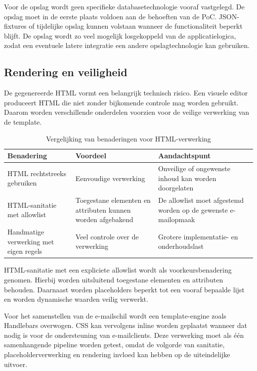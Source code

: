 Voor de opslag wordt geen specifieke databasetechnologie vooraf vastgelegd.
De opslag moet in de eerste plaats voldoen aan de behoeften van de PoC.
JSON-fixtures of tijdelijke opslag kunnen volstaan wanneer de functionaliteit
beperkt blijft. De opslag wordt zo veel mogelijk losgekoppeld van de
applicatielogica, zodat een eventuele latere integratie een andere
opslagtechnologie kan gebruiken.

\subsection{Rendering en veiligheid}
De gegenereerde HTML vormt een belangrijk technisch risico. Een visuele
editor produceert HTML die niet zonder bijkomende controle mag worden
gebruikt. Daarom worden verschillende onderdelen voorzien voor de veilige
verwerking van de template.

\begin{table}[htbp]
    \centering
    \caption{Vergelijking van benaderingen voor HTML-verwerking}
    \label{tab:html-vergelijking}
    \small
    \begin{tabular}{p{3.4cm}p{4.1cm}p{6cm}}
        \toprule
        \textbf{Benadering} &
        \textbf{Voordeel} &
        \textbf{Aandachtspunt} \\
        \midrule
        HTML rechtstreeks gebruiken &
        Eenvoudige verwerking &
        Onveilige of ongewenste inhoud kan worden doorgelaten \\
        \addlinespace
        HTML-sanitatie met allowlist &
        Toegestane elementen en attributen kunnen worden afgebakend &
        De allowlist moet afgestemd worden op de gewenste e-mailopmaak \\
        \addlinespace
        Handmatige verwerking met eigen regels &
        Veel controle over de verwerking &
        Grotere implementatie- en onderhoudslast \\
        \bottomrule
    \end{tabular}
\end{table}

HTML-sanitatie met een expliciete allowlist wordt als voorkeursbenadering
genomen. Hierbij worden uitsluitend toegestane elementen en attributen
behouden. Daarnaast worden placeholders beperkt tot een vooraf bepaalde
lijst en worden dynamische waarden veilig verwerkt.

Voor het samenstellen van de e-mailschil wordt een template-engine zoals
Handlebars overwogen. CSS kan vervolgens inline worden geplaatst wanneer
dat nodig is voor de ondersteuning van e-mailclients. Deze verwerking
moet als één samenhangende pipeline worden getest, omdat de volgorde van
sanitatie, placeholderverwerking en rendering invloed kan hebben op de
uiteindelijke uitvoer.

